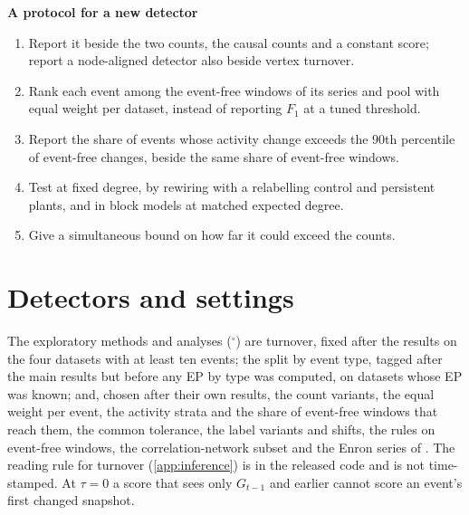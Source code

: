 \documentclass[11pt]{article}
\theoremstyle{dsplain}
\theoremstyle{definition}
\begin{document}
\begin{tcolorbox}[dsthm, top=7pt, bottom=7pt]
{\sffamily\bfseries\color{dsnavy}A protocol for a new detector}\par\vspace{3pt}
\begin{enumerate}[label=(\roman*),leftmargin=2.2em,itemsep=1pt,topsep=0pt,parsep=0pt]
  \item Report it beside the two counts, the causal counts and a constant score; report a node-aligned
  detector also beside vertex turnover.
  \item Rank each event among the event-free windows of its series and pool with equal weight per dataset,
  instead of reporting $F_1$ at a tuned threshold.
  \item Report the share of events whose activity change exceeds the $90$th percentile of event-free
  changes, beside the same share of event-free windows.
  \item Test at fixed degree, by rewiring with a relabelling control and persistent plants, and in block
  models at matched expected degree.
  \item Give a simultaneous bound on how far it could exceed the counts.
\end{enumerate}
\end{tcolorbox}




\appendix
{}

\section{Detectors and settings}
\label{app:settings}

The
exploratory methods and analyses ($^\circ$) are turnover, fixed after the results on the four datasets with
at least ten events; the split by event type, tagged after the main results but before any EP by type was
computed, on datasets whose EP was known; and, chosen after their own results, the count variants, the equal
weight per event, the activity strata and the share of event-free windows that reach them, the common
tolerance, the label variants and shifts, the rules on event-free windows, the correlation-network subset
and the Enron series of \citet{peel2015detecting}. The reading rule for turnover (\cref{app:inference}) is
in the released code and is not time-stamped. At $\tau = 0$ a score that sees only $G_{t-1}$ and earlier
cannot score an event's first changed snapshot.
\end{document}
